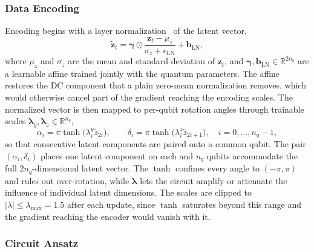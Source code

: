 \documentclass[12pt,onecolumn]{IEEEtran}
\begin{document}
\subsubsection{Data Encoding}

Encoding begins with a layer normalization~\cite{ba2016layer} of the latent vector,
\begin{equation}
    \tilde{\mathbf{z}}_t = \boldsymbol{\gamma}\odot\frac{\mathbf{z}_t - \mu_{z}}{\sigma_{z} + \epsilon_{\mathrm{LN}}} + \mathbf{b}_{\mathrm{LN}},
    \label{eq:ln_z}
\end{equation}
where $\mu_{z}$ and $\sigma_{z}$ are the mean and standard deviation of $\mathbf{z}_t$, and $\boldsymbol{\gamma},\mathbf{b}_{\mathrm{LN}}\in\mathbb{R}^{2n_q}$ are a learnable affine trained jointly with the quantum parameters. The affine restores the DC component that a plain zero-mean normalization removes, which would otherwise cancel part of the gradient reaching the encoding scales. The normalized vector is then mapped to per-qubit rotation angles through trainable scales $\boldsymbol{\lambda}_y, \boldsymbol{\lambda}_z \in \mathbb{R}^{n_q}$,
\begin{equation}
    \alpha_i = \pi \tanh\bigl(\lambda^y_i \tilde{z}_{2i}\bigr),
    \qquad
    \delta_i = \pi \tanh\bigl(\lambda^z_i \tilde{z}_{2i+1}\bigr),
    \quad i = 0,\ldots,n_q-1,
    \label{eq:encoding_angles}
\end{equation}
so that consecutive latent components are paired onto a common qubit. 
The pair $(\alpha_i,\delta_i)$ places one latent component on each and $n_q$ qubits accommodate the full $2n_q$-dimensional latent vector. 
The $\tanh$ confines every angle to $(-\pi,\pi)$ and rules out over-rotation, while $\boldsymbol{\lambda}$ lets the circuit amplify or attenuate the influence of individual latent dimensions.
The scales are clipped to $|\lambda|\leq\lambda_{\max}=1.5$ after each update, since $\tanh$ saturates beyond this range and the gradient reaching the encoder would vanish with it.

\subsubsection{Circuit Ansatz}
\end{document}
